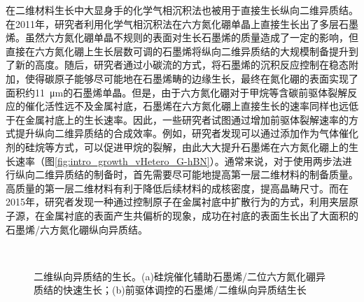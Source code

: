     在二维材料生长中大显身手的化学气相沉积法也被用于直接生长纵向二维异质结。在2011年，研究者利用化学气相沉积法在六方氮化硼单晶上直接生长出了多层石墨烯。虽然六方氮化硼单晶不规则的表面对生长石墨烯的质量造成了一定的影响，但直接在六方氮化硼上生长层数可调的石墨烯将纵向二维异质结的大规模制备提升到了新的高度。随后，研究者通过小碳流的方式，将石墨烯的沉积反应控制在稳态附加，使得碳原子能够尽可能地在石墨烯畴的边缘生长，最终在氮化硼的表面实现了面积约\SI{11}{\micro\metre}的石墨烯单晶。但是，由于六方氮化硼对于甲烷等含碳前驱体裂解反应的催化活性远不及金属衬底，石墨烯在六方氮化硼上直接生长的速率同样也远低于在金属衬底上的生长速率。因此，一些研究者试图通过增加前驱体裂解速率的方式提升纵向二维异质结的合成效率。例如，研究者发现可以通过添加作为气体催化剂的硅烷等方式，可以促进甲烷的裂解，由此大大提升石墨烯在六方氮化硼上的生长速率（图\ref{fig:intro_growth_vHetero_G-hBN}）。通常来说，对于使用两步法进行纵向二维异质结的制备时，首先需要尽可能地提高第一层二维材料的制备质量。高质量的第一层二维材料有利于降低后续材料的成核密度，提高晶畴尺寸。而在2015年，研究者发现一种通过控制原子在金属衬底中扩散行为的方式，利用夹层原子源，在金属衬底的表面产生共偏析的现象，成功在衬底的表面生长出了大面积的石墨烯/六方氮化硼纵向异质结。

    \begin{figure}[htb]
        \\[-0.5ex]
        \caption{二维纵向异质结的生长。(a)硅烷催化辅助石墨烯/二位六方氮化硼异质结的快速生长；(b)前驱体调控的石墨烯/二维纵向异质结生长}
    \end{figure}
    
